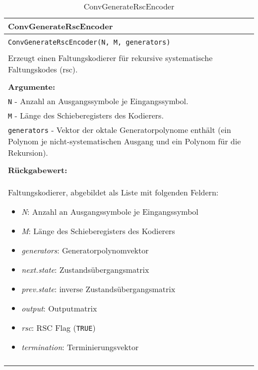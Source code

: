 \begin{longtable}{|p{\textwidth}|}
\hline
\rowcolor{lightblue}
ConvGenerateRscEncoder
\\
\hline
\\
\texttt{ConvGenerateRscEncoder(N, M, generators)}\\
\\
Erzeugt einen Faltungskodierer für rekursive systematische Faltungskodes (rsc).\\
\\
\textbf{Argumente:}\\
\texttt{N} - Anzahl an Ausgangssymbole je Eingangssymbol.\\
\texttt{M} - Länge des Schieberegisters des Kodierers.\\
\texttt{generators} - Vektor der oktale Generatorpolynome enthält (ein Polynom je nicht-systematischen Ausgang und ein Polynom für die Rekursion).\\
\\
\textbf{Rückgabewert:}\\
Faltungskodierer, abgebildet als Liste mit folgenden Feldern:
\vspace{-4mm}
\begin{itemize}
\renewcommand\labelitemi{--}
\itemsep-.5em %
\item \emph{N}: Anzahl an Ausgangssymbole je Eingangssymbol
\item \emph{M}: Länge des Schieberegisters des Kodierers
\item \emph{generators}: Generatorpolynomvektor
\item \emph{next.state}: Zustandsübergangsmatrix
\item \emph{prev.state}: inverse Zustandsübergangsmatrix
\item \emph{output}: Outputmatrix
\item \emph{rsc}: RSC Flag (\texttt{TRUE})
\item \emph{termination}: Terminierungsvektor
\end{itemize}
\\
\hline
\caption{ConvGenerateRscEncoder}
\end{longtable}